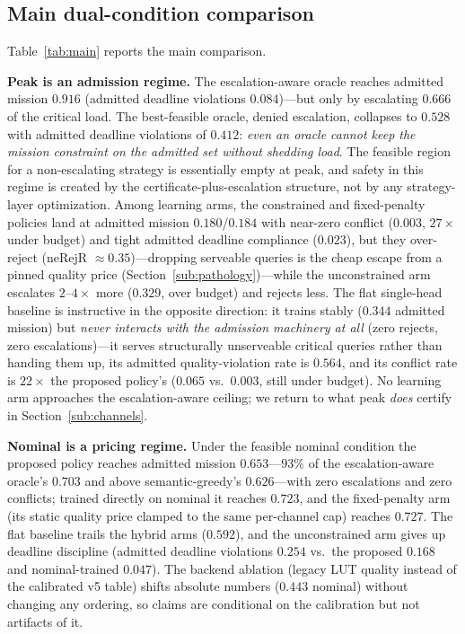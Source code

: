 \subsection{Main dual-condition comparison}\label{sub:main}
Table~\ref{tab:main} reports the main comparison.

\textbf{Peak is an admission regime.} The escalation-aware oracle reaches
admitted mission $0.916$ (admitted deadline violations $0.084$)---but only
by escalating $0.666$ of the critical load. The best-feasible oracle,
denied escalation, collapses to $0.528$ with admitted deadline violations
of $0.412$: \emph{even an oracle cannot keep the mission constraint on the
admitted set without shedding load}. The feasible region for a
non-escalating strategy is essentially empty at peak, and safety in this
regime is created by the certificate-plus-escalation structure, not by any
strategy-layer optimization. Among learning arms, the constrained and
fixed-penalty policies land at admitted mission
$0.180$/$0.184$ with near-zero conflict ($0.003$, $27\times$ under
budget) and tight admitted deadline compliance ($0.023$), but they
over-reject (neRejR $\approx0.35$)---dropping serveable queries is the
cheap escape from a pinned quality price
(Section~\ref{sub:pathology})---while the unconstrained arm escalates
$2$--$4\times$ more ($0.329$, over budget) and rejects less. The flat
single-head baseline is instructive in the opposite direction: it trains
stably ($0.344$ admitted mission) but \emph{never interacts with the
admission machinery at all} (zero rejects, zero escalations)---it serves
structurally unserveable critical queries rather than handing them up,
its admitted quality-violation rate is $0.564$, and its conflict rate is
$22\times$ the proposed policy's ($0.065$ vs.\ $0.003$, still under
budget). No learning arm approaches the escalation-aware ceiling; we
return to what peak \emph{does} certify in
Section~\ref{sub:channels}.

\textbf{Nominal is a pricing regime.} Under the feasible nominal
condition the proposed policy reaches admitted mission $0.653$---$93\%$ of
the escalation-aware oracle's $0.703$ and above semantic-greedy's
$0.626$---with zero escalations and zero conflicts; trained directly on
nominal it reaches $0.723$, and the fixed-penalty arm (its static quality
price clamped to the same per-channel cap) reaches $0.727$. The flat
baseline trails the hybrid arms ($0.592$), and the unconstrained arm gives
up deadline discipline (admitted deadline violations $0.254$ vs.\ the
proposed $0.168$ and nominal-trained $0.047$). The backend ablation
(legacy LUT quality instead of the calibrated v5 table) shifts absolute
numbers ($0.443$ nominal) without changing any ordering, so claims are
conditional on the calibration but not artifacts of it.

